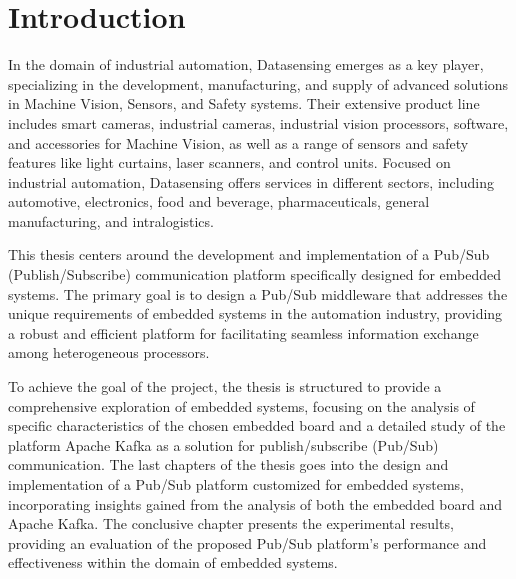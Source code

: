 

\chapter*{Introduction}

In the domain of industrial automation, Datasensing emerges as a key player, specializing in the development, manufacturing, and supply of advanced solutions in Machine Vision, Sensors, and Safety systems.
Their extensive product line includes smart cameras, industrial cameras, industrial vision processors, software, and accessories for Machine Vision, as well as a range of sensors and safety features like light curtains, laser scanners, and control units. Focused on industrial automation, Datasensing offers services in different sectors, including automotive, electronics, food and beverage, pharmaceuticals, general manufacturing, and intralogistics.

This thesis centers around the development and implementation of a Pub/Sub (Publish/Subscribe) communication platform specifically designed for embedded systems. 
The primary goal is to design a Pub/Sub middleware that addresses the unique requirements of embedded systems in the automation industry, providing a robust and efficient platform for facilitating seamless information exchange among heterogeneous processors.

To achieve the goal of the project, the thesis is structured to provide a comprehensive exploration of embedded systems, focusing on the analysis of specific characteristics of the chosen embedded board and a detailed study of the platform Apache Kafka as a solution for publish/subscribe (Pub/Sub) communication.
The last chapters of the thesis goes into the design and implementation of a Pub/Sub platform customized for embedded systems, incorporating insights gained from the analysis of both the embedded board and Apache Kafka.
The conclusive chapter presents the experimental results, providing an evaluation of the proposed Pub/Sub platform's performance and effectiveness within the domain of embedded systems.
